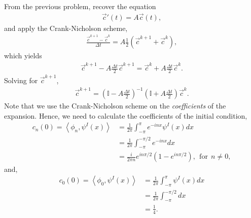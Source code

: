 \begin{questions}
\begin{solution}
From the previous problem, recover the equation
\begin{align*}
\overrightarrow{c}' (t) = A\overrightarrow{c}(t),
\end{align*}
and apply the Crank-Nicholson scheme,
\begin{align*}
\frac{\overrightarrow{c}^{k+1}-\overrightarrow{c}^{k}}{\Delta t} = A\frac{1}{2}\left(\overrightarrow{c}^{k+1}+\overrightarrow{c}^{k}\right),
\end{align*}
which yields
\begin{align*}
\overrightarrow{c}^{k+1} - A\frac{\Delta t}{2} \overrightarrow{c}^{k+1} = \overrightarrow{c}^{k} + A\frac{\Delta t}{2} \overrightarrow{c}^{k}.
\end{align*}
Solving for $\overrightarrow{c}^{k+1}$,
\begin{align*}
\overrightarrow{c}^{k+1}= \left(\mathbb{I} - A\frac{\Delta t}{2}\right)^{-1}\left(\mathbb{I} + A\frac{\Delta t}{2}\right) \overrightarrow{c}^{k}.
\end{align*}
Note that we use the Crank-Nicholson scheme on the \textit{coefficients} of the expansion. Hence, we need to calculate the coefficients of the initial condition,
\begin{align*}
c_n(0) = \left\langle\phi_n,\psi^I(x)\right\rangle &= \frac{1}{2\pi}\int_{-\pi}^{\pi}e^{-inx}\psi^I(x)dx\\
&= \frac{1}{2\pi}\int_{-\pi}^{-\pi/2}e^{-inx}dx\\
&= \frac{i}{2\pi n}e^{in\pi/2}\left(1-e^{in\pi/2}\right), ~~\text{for}~~ n\neq 0,
\end{align*}
and, 
\begin{align*}
c_0(0) = \left\langle\phi_0,\psi^I(x)\right\rangle &= \frac{1}{2\pi}\int_{-\pi}^{\pi}\psi^I(x)dx\\
&= \frac{1}{2\pi}\int_{-\pi}^{-\pi/2}dx\\
&= \frac{1}{4}.
\end{align*}
\end{solution}
\end{questions}